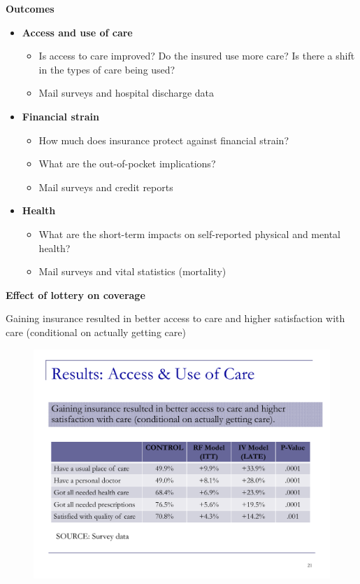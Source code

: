 \documentclass[notes=show]{beamer}
\begin{document}
\begin{frame}[plain]
	\begin{center}
	\textbf{Outcomes}
	\end{center}
	
	\begin{itemize}
	\item \textbf{Access and use of care}
		\begin{itemize}
		\item Is access to care improved? Do the insured use more care? Is there a shift in the types of care being used?
		\item Mail surveys and hospital discharge data
		\end{itemize}
	\item \textbf{Financial strain}
		\begin{itemize}
		\item How much does insurance protect against financial strain?
		\item What are the out-of-pocket implications?
		\item Mail surveys and credit reports
		\end{itemize}
	\item \textbf{Health}
		\begin{itemize}
		\item What are the short-term impacts on self-reported physical and mental health?
		\item Mail surveys and vital statistics (mortality)
		\end{itemize}
	\end{itemize}
\end{frame}

\begin{frame}[plain]
	\begin{center}
	\textbf{Effect of lottery on coverage}
	\end{center}

Gaining insurance resulted in better access to care and higher satisfaction with care (conditional on actually getting care)
		
	\begin{figure}
	\includegraphics[scale=0.40]{./lecture_includes/baicker_4.pdf}
	\end{figure}
\end{frame}
\end{document}
